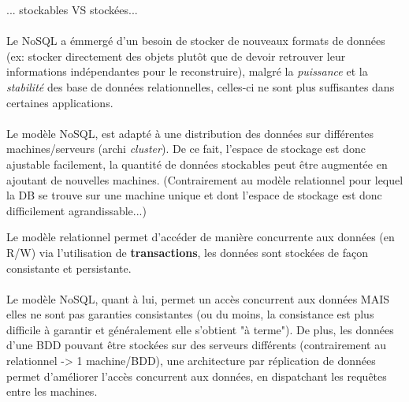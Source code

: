 \item{}
{\faux}
{... stockables VS stockées...

\paragraph{}
Le NoSQL a émmergé d'un besoin de stocker de nouveaux formats de données (ex: stocker directement des objets plutôt que de devoir retrouver leur informations indépendantes pour le reconstruire), malgré la \textit{puissance} et la \textit{stabilité} des base de données relationnelles, celles-ci ne sont plus suffisantes dans certaines applications.
\paragraph{}
Le modèle NoSQL, est adapté à une distribution des données sur différentes machines/serveurs (archi \textit{cluster}). De ce fait, l'espace de stockage est donc ajustable facilement, la quantité de données stockables peut être augmentée en ajoutant de nouvelles machines. (Contrairement  au modèle relationnel pour lequel la DB se trouve sur une machine unique et dont l'espace de stockage est donc difficilement agrandissable...)
}


\item{}
{\faux}
{Le modèle relationnel permet d'accéder de manière concurrente aux données (en R/W) via l'utilisation de \textbf{transactions}, les données sont stockées de façon consistante et persistante.

\paragraph{}
Le modèle NoSQL, quant à lui, permet un accès concurrent aux données MAIS elles ne sont pas garanties consistantes (ou du moins, la consistance est plus difficile à garantir et généralement elle s'obtient "à terme"). De plus, les données d'une BDD pouvant être stockées sur des serveurs différents (contrairement au relationnel -> 1 machine/BDD), une architecture par réplication de données permet d'améliorer l'accès concurrent aux données, en dispatchant les requêtes entre les machines. 
}


